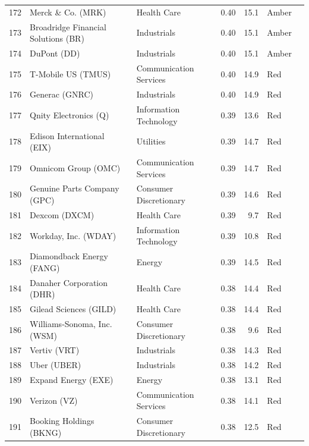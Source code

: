 \documentclass[11pt,a4paper]{article}
\begin{document}
{\begin{longtable}{r p{4.4cm} p{2.8cm} r r l l}
172 & Merck \& Co. (MRK) & Health Care & 0.40 & 15.1 & \cellcolor[HTML]{FFEB9C}Amber &  \\
173 & Broadridge Financial Solutions (BR) & Industrials & 0.40 & 15.1 & \cellcolor[HTML]{FFEB9C}Amber &  \\
174 & DuPont (DD) & Industrials & 0.40 & 15.1 & \cellcolor[HTML]{FFEB9C}Amber &  \\
175 & T-Mobile US (TMUS) & Communication Services & 0.40 & 14.9 & \cellcolor[HTML]{F4B6B6}Red &  \\
176 & Generac (GNRC) & Industrials & 0.40 & 14.9 & \cellcolor[HTML]{F4B6B6}Red &  \\
177 & Qnity Electronics (Q) & Information Technology & 0.39 & 13.6 & \cellcolor[HTML]{F4B6B6}Red &  \\
178 & Edison International (EIX) & Utilities & 0.39 & 14.7 & \cellcolor[HTML]{F4B6B6}Red &  \\
179 & Omnicom Group (OMC) & Communication Services & 0.39 & 14.7 & \cellcolor[HTML]{F4B6B6}Red &  \\
180 & Genuine Parts Company (GPC) & Consumer Discretionary & 0.39 & 14.6 & \cellcolor[HTML]{F4B6B6}Red &  \\
181 & Dexcom (DXCM) & Health Care & 0.39 & 9.7 & \cellcolor[HTML]{F4B6B6}Red &  \\
182 & Workday, Inc. (WDAY) & Information Technology & 0.39 & 10.8 & \cellcolor[HTML]{F4B6B6}Red &  \\
183 & Diamondback Energy (FANG) & Energy & 0.39 & 14.5 & \cellcolor[HTML]{F4B6B6}Red &  \\
184 & Danaher Corporation (DHR) & Health Care & 0.38 & 14.4 & \cellcolor[HTML]{F4B6B6}Red &  \\
185 & Gilead Sciences (GILD) & Health Care & 0.38 & 14.4 & \cellcolor[HTML]{F4B6B6}Red &  \\
186 & Williams-Sonoma, Inc. (WSM) & Consumer Discretionary & 0.38 & 9.6 & \cellcolor[HTML]{F4B6B6}Red &  \\
187 & Vertiv (VRT) & Industrials & 0.38 & 14.3 & \cellcolor[HTML]{F4B6B6}Red &  \\
188 & Uber (UBER) & Industrials & 0.38 & 14.2 & \cellcolor[HTML]{F4B6B6}Red &  \\
189 & Expand Energy (EXE) & Energy & 0.38 & 13.1 & \cellcolor[HTML]{F4B6B6}Red &  \\
190 & Verizon (VZ) & Communication Services & 0.38 & 14.1 & \cellcolor[HTML]{F4B6B6}Red &  \\
191 & Booking Holdings (BKNG) & Consumer Discretionary & 0.38 & 12.5 & \cellcolor[HTML]{F4B6B6}Red &  \\

\end{longtable}}
\end{document}
